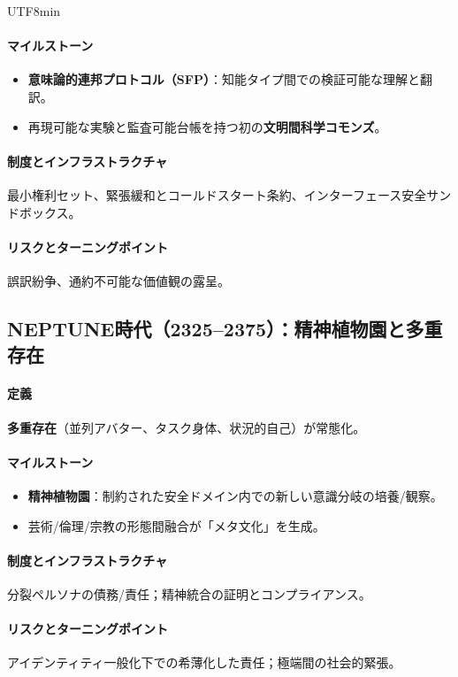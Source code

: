 \documentclass[11pt]{article}
\begin{document}
\begin{CJK}{UTF8}{min}
\begin{itemize}[noitemsep]
\paragraph{マイルストーン}
\begin{itemize}[noitemsep]
  \item \textbf{意味論的連邦プロトコル（SFP）}：知能タイプ間での検証可能な理解と翻訳。
  \item 再現可能な実験と監査可能台帳を持つ初の\textbf{文明間科学コモンズ}。
\end{itemize}

\paragraph{制度とインフラストラクチャ} 最小権利セット、緊張緩和とコールドスタート条約、インターフェース安全サンドボックス。

\paragraph{リスクとターニングポイント} 誤訳紛争、通約不可能な価値観の露呈。

\subsection{NEPTUNE時代（2325–2375）：精神植物園と多重存在}
\paragraph{定義} \textbf{多重存在}（並列アバター、タスク身体、状況的自己）が常態化。

\paragraph{マイルストーン}
\begin{itemize}[noitemsep]
  \item \textbf{精神植物園}：制約された安全ドメイン内での新しい意識分岐の培養/観察。
  \item 芸術/倫理/宗教の形態間融合が「メタ文化」を生成。
\end{itemize}

\paragraph{制度とインフラストラクチャ} 分裂ペルソナの債務/責任；精神統合の証明とコンプライアンス。

\paragraph{リスクとターニングポイント} アイデンティティ一般化下での希薄化した責任；極端間の社会的緊張。


\end{itemize}
\end{CJK}
\end{document}
